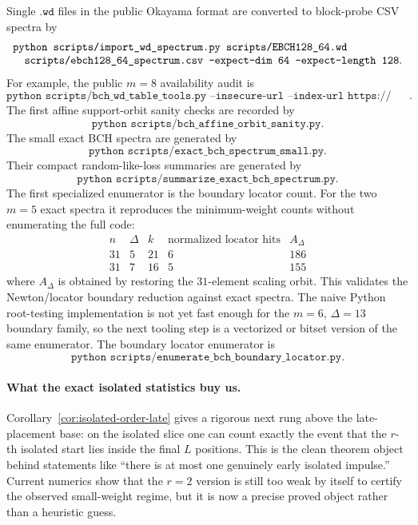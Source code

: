 Single \(\texttt{.wd}\) files in the public Okayama format are converted to block-probe CSV spectra by
\[
\begin{array}{l}
\texttt{python scripts/import\_wd\_spectrum.py scripts/EBCH128\_64.wd}\\
\texttt{\quad scripts/ebch128\_64\_spectrum.csv --expect-dim 64 --expect-length 128}.
\end{array}
\]
For example, the public \(m=8\) availability audit is
\[
\texttt{python scripts/bch\_wd\_table\_tools.py --insecure-url --index-url https://isec.ec.okayama-u.ac.jp/home/kusaka/wd/ --section "Extended Binary Primitive BCH Codes" --length 256}.
\]
The first affine support-orbit sanity checks are recorded by
\[
\texttt{python scripts/bch\_affine\_orbit\_sanity.py}.
\]
The small exact BCH spectra are generated by
\[
\texttt{python scripts/exact\_bch\_spectrum\_small.py}.
\]
Their compact random-like-loss summaries are generated by
\[
\texttt{python scripts/summarize\_exact\_bch\_spectrum.py}.
\]
The first specialized enumerator is the boundary locator count.  For the two \(m=5\) exact spectra it reproduces the
minimum-weight counts without enumerating the full code:
\[
\begin{array}{c|c|c|c|c}
n & \Delta & k & \text{normalized locator hits} & A_\Delta\\
\hline
31 & 5 & 21 & 6 & 186\\
31 & 7 & 16 & 5 & 155
\end{array}
\]
where \(A_\Delta\) is obtained by restoring the \(31\)-element scaling orbit.  This validates the Newton/locator
boundary reduction against exact spectra.  The naive Python root-testing implementation is not yet fast enough for the
\(m=6\), \(\Delta=13\) boundary family, so the next tooling step is a vectorized or bitset version of the same
enumerator.
The boundary locator enumerator is
\[
\texttt{python scripts/enumerate\_bch\_boundary\_locator.py}.
\]

\paragraph{What the exact isolated statistics buy us.}
Corollary~\ref{cor:isolated-order-late} gives a rigorous next rung above the late-placement base: on the isolated
slice one can count exactly the event that the \(r\)-th isolated start lies inside the final \(L\) positions. This is
the clean theorem object behind statements like ``there is at most one genuinely early isolated impulse.'' Current
numerics show that the \(r=2\) version is still too weak by itself to certify the observed small-weight regime, but it
is now a precise proved object rather than a heuristic guess.

